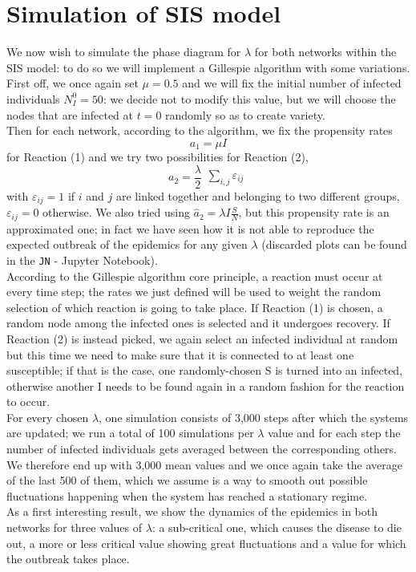 \documentclass[a4paper,11pt]{article}
\begin{document}
\section{Simulation of SIS model}
We now wish to simulate the phase diagram for $\lambda$ for both networks within the SIS model: to do so we will implement a Gillespie algorithm with some variations.
\\
First off, we once again set $\mu=0.5$ and we will fix the initial number of infected individuals $N^0_I = 50$: we decide not to modify this value, but we will choose the nodes that are infected at $t=0$ randomly so as to create variety.
\\
Then for each network, according to the algorithm, we fix the propensity rates 
\begin{equation}
    a_1 = \mu I
\end{equation}
for Reaction (1) and we try two possibilities for Reaction (2), 
\begin{equation}
     a_2= \frac{\lambda}{2} \begin{matrix} \sum_{i,j} {\varepsilon_{ij}} \end{matrix}
\end{equation}
with $\varepsilon_{ij}=1$ if $i$ and $j$ are linked together and belonging to two different groups, $\varepsilon_{ij}=0$ otherwise. We also tried using $\hat a_2=\lambda I \frac{S}{N}$, but this propensity rate is an approximated one; in fact we have seen how it is not able to reproduce the expected outbreak of the epidemics for any given $\lambda$ (discarded plots can be found in the \texttt{JN} - Jupyter Notebook).
\\
According to the Gillespie algorithm core principle, a reaction must occur at every time step; the rates we just defined will be used to weight the random selection of which reaction is going to take place. If Reaction (1) is chosen, a random node among the infected ones is selected and it undergoes recovery. If Reaction (2) is instead picked, we again select an infected individual at random but this time we need to make sure that it is connected to at least one susceptible; if that is the case, one randomly-chosen S is turned into an infected, otherwise another I needs to be found again in a random fashion for the reaction to occur.
\\
For every chosen $\lambda$, one simulation consists of 3,000 steps after which the systems are updated; we run a total of 100 simulations per $\lambda$ value and for each step the number of infected individuals gets averaged between the corresponding others. We therefore end up with 3,000 mean values and we once again take the average of the last 500 of them, which we assume is a way to smooth out possible fluctuations happening when the system has reached a stationary regime. 
\\
As a first interesting result, we show the dynamics of the epidemics in both networks for three values of $\lambda$: a sub-critical one, which causes the disease to die out, a more or less critical value showing great fluctuations and a value for which the outbreak takes place.
\end{document}
